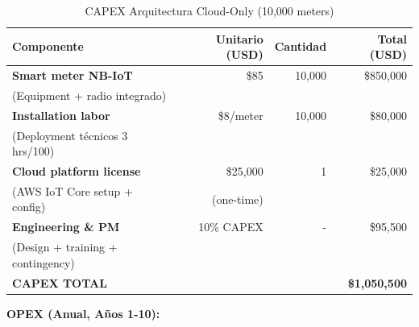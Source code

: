 \begin{table}[H]
\centering
\caption{CAPEX Arquitectura Cloud-Only (10,000 meters)}
\label{tab:capex-cloud-only}
\small
\begin{tabular}{|p{5cm}|r|r|r|}
\hline
\rowcolor{blue!20}
\textbf{Componente} & \textbf{Unitario (USD)} & \textbf{Cantidad} & \textbf{Total (USD)} \\
\hline
\textbf{Smart meter NB-IoT} & \$85 & 10,000 & \$850,000 \\
(Equipment + radio integrado) & & & \\
\hline
\textbf{Installation labor} & \$8/meter & 10,000 & \$80,000 \\
(Deployment técnicos 3 hrs/100) & & & \\
\hline
\textbf{Cloud platform license} & \$25,000 & 1 & \$25,000 \\
(AWS IoT Core setup + config) & (one-time) & & \\
\hline
\textbf{Engineering \& PM} & 10\% CAPEX & - & \$95,500 \\
(Design + training + contingency) & & & \\
\hline
\rowcolor{gray!20}
\textbf{CAPEX TOTAL} & & & \textbf{\$1,050,500} \\
\hline
\end{tabular}
\end{table}

\textbf{OPEX (Anual, Años 1-10):}

